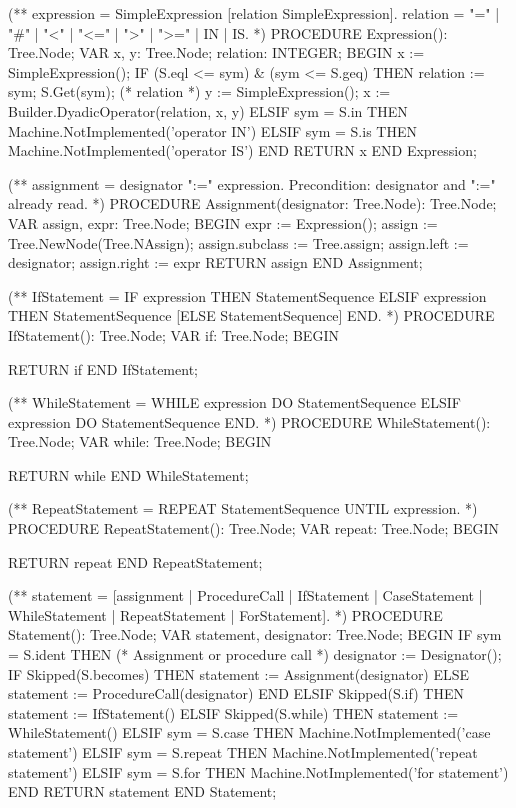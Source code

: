 \documentclass[utf8]{lgu}
\begin{document}
\begin{modula2long}
(** expression = SimpleExpression [relation SimpleExpression].
     relation = "=" | "#" | "<" | "<=" | ">" | ">=" | IN | IS. *)
PROCEDURE Expression(): Tree.Node;
VAR x, y: Tree.Node;
  relation: INTEGER;
BEGIN
  x := SimpleExpression();
  IF (S.eql <= sym) & (sym <= S.geq) THEN
    relation := sym;
    S.Get(sym); (* relation *)
    y := SimpleExpression();
    x := Builder.DyadicOperator(relation, x, y)
  ELSIF sym = S.in THEN
    Machine.NotImplemented('operator IN')
  ELSIF sym = S.is THEN
    Machine.NotImplemented('operator IS')
  END
RETURN x END Expression;

(** assignment = designator ":=" expression.
     Precondition: designator and ":=" already read. *)
PROCEDURE Assignment(designator: Tree.Node): Tree.Node;
VAR assign, expr: Tree.Node;
BEGIN
  expr := Expression();
  assign := Tree.NewNode(Tree.NAssign);
  assign.subclass := Tree.assign;
  assign.left := designator;
  assign.right := expr
RETURN assign END Assignment;

(** IfStatement = IF expression THEN StatementSequence
    {ELSIF expression THEN StatementSequence}
    [ELSE StatementSequence] END. *)
PROCEDURE IfStatement(): Tree.Node;
VAR if: Tree.Node;
BEGIN

RETURN if END IfStatement;

(** WhileStatement = WHILE expression DO StatementSequence
    {ELSIF expression DO StatementSequence} END. *)
PROCEDURE WhileStatement(): Tree.Node;
VAR while: Tree.Node;
BEGIN

RETURN while END WhileStatement;

(** RepeatStatement = REPEAT StatementSequence UNTIL expression. *)
PROCEDURE RepeatStatement(): Tree.Node;
VAR repeat: Tree.Node;
BEGIN

RETURN repeat END RepeatStatement;

(** statement = [assignment | ProcedureCall | IfStatement | CaseStatement |
    WhileStatement | RepeatStatement | ForStatement]. *)
PROCEDURE Statement(): Tree.Node;
VAR statement, designator: Tree.Node;
BEGIN
  IF sym = S.ident THEN (* Assignment or procedure call *)
    designator := Designator();
    IF Skipped(S.becomes) THEN
      statement := Assignment(designator)
    ELSE
      statement := ProcedureCall(designator)
    END
  ELSIF Skipped(S.if) THEN
    statement := IfStatement()
  ELSIF Skipped(S.while) THEN
    statement := WhileStatement()
  ELSIF sym = S.case THEN
    Machine.NotImplemented('case statement')
  ELSIF sym = S.repeat THEN
    Machine.NotImplemented('repeat statement')
  ELSIF sym = S.for THEN
    Machine.NotImplemented('for statement')
  END
RETURN statement END Statement;


\end{modula2long}
\end{document}
